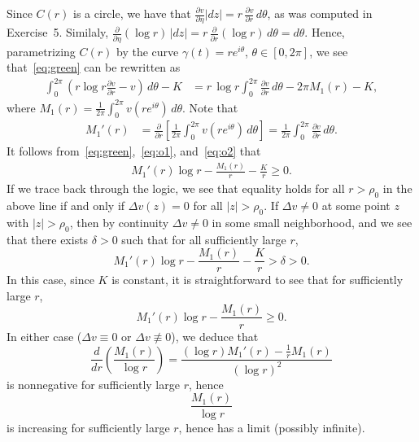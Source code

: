 \documentclass[11pt]{book}
\theoremstyle{definition}
\begin{document}
\begin{enumerate}
    Since $C(r)$ is a circle, we have that $\frac{\partial v}{\partial \eta} |dz| = r \, \frac{\partial v}{\partial r}  \, d\theta$, as was computed in Exercise~5.  Similaly, $\frac{\partial}{\partial \eta}( \log r)  \, |dz| = r \, \frac{\partial}{\partial r} (\log r) \, d\theta = d\theta$.  Hence, parametrizing $C(r)$ by the curve $\gamma(t) = re^{i\theta}$, $\theta\in [0,2\pi]$, we see that~\eqref{eq:green} can be rewritten as 
    \begin{align}
      \int_{0}^{2\pi} \left( r \log r \frac{\partial v}{\partial r} - v \right) \, d\theta - K &= r \, \log r \int_0^{2\pi} \frac{\partial v}{\partial r} \, d\theta - 2\pi M_1(r) - K,  \label{eq:o1}
    \end{align}
    where $M_1(r) = \frac{1}{2\pi} \int_0^{2\pi} v(re^{i\theta}) \, d\theta$. Note that 
    \begin{align} 
      M_1'(r) &= \frac{\partial}{\partial r} \left[ \frac{1}{2\pi} \int_0^{2\pi} v(re^{i\theta}) \, d\theta \right] 
      = \frac{1}{2\pi} \int_0^{2\pi} \frac{\partial v}{\partial r} \, d\theta. \label{eq:o2}
    \end{align} It follows from~\eqref{eq:green},~\eqref{eq:o1}, and~\eqref{eq:o2} that  
    \begin{align*}
          M_1'(r) \log r -  \frac{M_1(r)}{r} - \frac{K}{r} \geq 0. 
    \end{align*}
    If we trace back through the logic, we see that equality holds for all $r>\rho_0$ in the above line if and only if $\Delta v (z) = 0$ for all $|z| > \rho_0$.  If $\Delta v \neq 0$ at some point $z$ with $|z|> \rho_0$, then by continuity $\Delta v \neq 0$ in some small neighborhood, and we see that there exists $\delta > 0$ such that for all sufficiently large $r$, 
    \[ M_1'(r) \log r - \frac{M_1(r)}{r} - \frac{K}{r} > \delta > 0.\]    In this case, since $K$ is constant, it is straightforward to see that for sufficiently large $r$, 
    \[ M_1'(r) \log r - \frac{M_1(r)}{r} \geq 0. \] 
    In either case ($\Delta v \equiv 0$ or $\Delta v \not \equiv 0$), we deduce that 
    \[ \frac{d}{dr} \left( \frac{M_1(r)}{\log r} \right) = \frac{(\log r) M_1'(r) - \tfrac{1}{r} M_1(r)}{(\log r)^2} \] is nonnegative for sufficiently large $r$, hence
    \[ \frac{M_1(r)}{\log r} \] is increasing for sufficiently large $r$, hence has a limit (possibly infinite). 


\end{enumerate}
\end{document}
